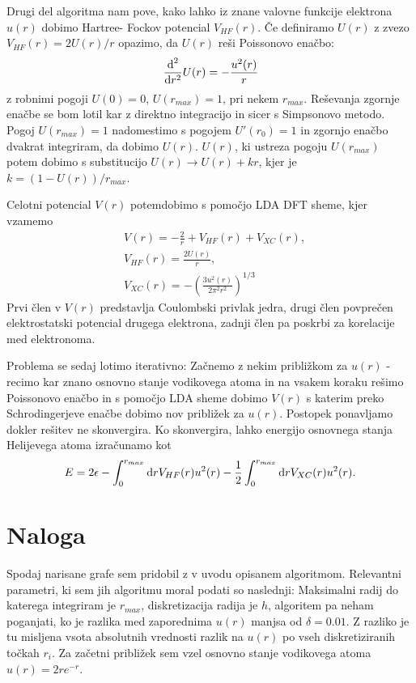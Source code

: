 \documentclass{article}
\begin{document}
Drugi del algoritma nam pove, kako lahko iz znane valovne funkcije elektrona $u(r)$ dobimo Hartree- Fockov potencial $V_{HF}(r)$. Če definiramo $U(r)$ z zvezo $V_{HF}(r) = 2 U(r) / r$ opazimo, da $U(r)$ reši Poissonovo enačbo:
\begin{equation*}
\frac{\textup{d}^2}{\textup{d}r^2} U(r) = - \frac{u^2(r)}{r}
\end{equation*}
z robnimi pogoji $U(0) = 0$, $U(r_{max}) = 1$, pri nekem $r_{max}$. Reševanja zgornje enačbe se bom lotil kar z direktno integracijo in sicer s Simpsonovo metodo. Pogoj $U(r_{max})=1$ nadomestimo s pogojem $U'(r_0)=1$ in zgornjo enačbo dvakrat integriram, da dobimo $U(r)$.
$U(r)$, ki ustreza pogoju $U(r_{max})$ potem dobimo s substitucijo $U(r) \to U(r) + k r$, kjer je $k=(1-U(r))/r_{max}$.

Celotni potencial $V(r)$ potemdobimo s pomočjo LDA DFT sheme, kjer vzamemo
\begin{align*}
&V(r) = -\frac{2}{r} + V_{HF} (r) + V_{XC}(r), \\
&V_{HF}(r) = \frac{2U(r)}{r}, \\
&V_{XC}(r) = - \left( \frac{3 u^2(r)}{2 \pi^2 r^2} \right)^{1/3}
\end{align*}
Prvi člen v $V(r)$ predstavlja Coulombski privlak jedra, drugi člen povprečen elektrostatski potencial drugega elektrona, zadnji člen pa poskrbi za korelacije med elektronoma.

Problema se sedaj lotimo iterativno: Začnemo z nekim približkom za $u(r)$ - recimo kar znano osnovno stanje vodikovega atoma in na vsakem koraku rešimo Poissonovo enačbo in s pomočjo LDA sheme dobimo $V(r)$ s katerim preko Schrodingerjeve enačbe dobimo nov približek za $u(r)$. Postopek ponavljamo dokler rešitev ne skonvergira.
Ko skonvergira, lahko energijo osnovnega stanja Helijevega atoma izračunamo kot
\begin{equation*}
E = 2 \epsilon - \int_0^{r_{max}} \textup{d}r V_{HF} (r) u^2(r) - \frac{1}{2} \int_0^{r_{max}} \textup{d}r V_{XC}(r) u^2(r).
\end{equation*}

\section*{Naloga}
Spodaj narisane grafe sem pridobil z v uvodu opisanem algoritmom. Relevantni parametri, ki sem jih algoritmu moral podati so naslednji:
Maksimalni radij do katerega integriram je $r_{max}$, diskretizacija radija je $h$, algoritem pa neham poganjati, ko je razlika med zaporednima $u(r)$ manjsa od $\delta = 0.01$. Z razliko je tu misljena vsota absolutnih vrednosti razlik na $u(r)$ po vseh diskretiziranih točkah $r_i$. Za začetni približek sem vzel osnovno stanje vodikovega atoma $u(r) = 2re^{-r}$.
\end{document}
